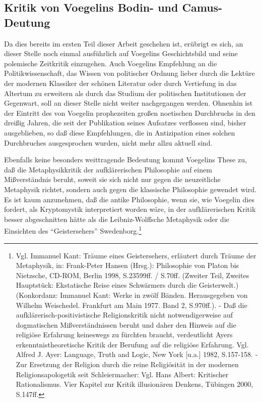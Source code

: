 \subsection{Kritik von Voegelins Bodin- und Camus-Deu\-tung}

Da dies bereits im ersten Teil dieser Arbeit geschehen ist, erübrigt es sich,
an dieser Stelle noch einmal ausführlich auf Voegelins Geschichtsbild und
seine polemische Zeitkritik einzugehen. Auch Voegelins Empfehlung an die
Politikwissenschaft, das Wissen von politischer Ordnung lieber durch die
Lektüre der modernen Klassiker der schönen Literatur oder durch Vertiefung in
das Altertum zu erweitern als durch das Studium der politischen Institutionen
der Gegenwart, soll an dieser Stelle nicht weiter nachgegangen werden.
Ohnenhin ist der Eintritt des von Voegelin prophezeiten großen noetischen
Durchbruchs in den dreißig Jahren, die seit der Publikation seines Aufsatzes
verflossen sind, bisher ausgeblieben, so daß diese Empfehlungen, die in
Antizipation eines solchen Durchbruches ausgesprochen wurden, nicht
mehr allzu aktuell sind.

Ebenfalls keine besonders weittragende Bedeutung kommt Voegelins These zu, daß
die Metaphysikkritik der aufklärerischen Philosophie auf einem Mißverständnis
beruht, soweit sie sich nicht nur gegen die neuzeitliche Metaphysik richtet,
sondern auch gegen die klassische Philosophie gewendet wird. Es ist kaum
anzunehmen, daß die antike Philosophie, wenn sie, wie Voegelin dies fordert,
als Kryptomystik interpretiert worden wäre, in der aufklärerischen Kritik
besser abgeschnitten hätte als die Leibniz-Wolffsche Metaphysik oder die
Einsichten des "`Geistersehers"' Swedenborg.\footnote{Vgl. Immanuel Kant:
  Träume eines Geistersehers, erläutert durch Träume der Metaphysik, in:
  Frank-Peter Hansen (Hrsg.): Philosophie von Platon bis Nietzsche, CD-ROM,
  Berlin 1998, S.23599ff. / S.70ff. (Zweiter Teil, Zweites Hauptstück:
  Ekstatische Reise eines Schwärmers durch die Geisterwelt.) (Konkordanz:
  Immanuel Kant: Werke in zwölf Bänden. Herausgegeben von Wilhelm Weischedel.
  Frankfurt am Main 1977. Band 2, S.970ff.). - Daß die
  aufklärerisch-positivistische Religionskritik nicht notwendigerweise auf
  dogmatischen Mißverständnissen beruht und daher den Hinweis auf die
  religiöse Erfahrung keineswegs zu fürchten braucht, verdeutlicht Ayers
  erkenntnistheoretische Kritik der Berufung auf die religiöse Erfahrung. Vgl.
  Alfred J. Ayer: Language, Truth and Logic, New York [u.a.]  1982, S.157-158.
  - Zur Ersetzung der Religion durch die reine Religiösität in der modernen
  Religionsapologetik seit Schleiermacher: Vgl. Hans Albert: Kritischer
  Rationalismus. Vier Kapitel zur Kritik illusionären Denkens, Tübingen 2000,
  S.147ff.}

